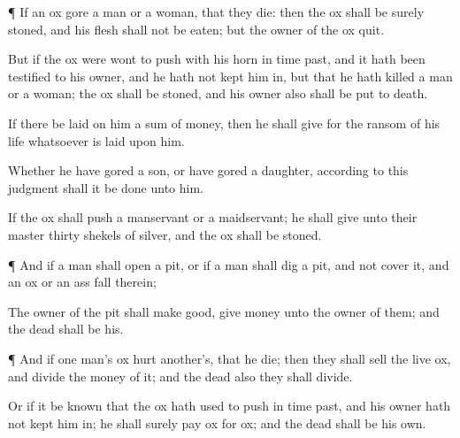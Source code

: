 {\par }{\PP {}¶ If an
ox
gore a
man or a
woman, that they
die: then the
ox shall be
surely
stoned, and his
flesh shall not be
eaten; but the
owner of the
ox
{}
quit.

But if the
ox were wont to push with his
horn in time
past, and it hath been
testified to his
owner, and he hath not
kept him in, but that he hath
killed a
man or a
woman; the
ox shall be
stoned, and his
owner also shall be put to
death.

If there be
laid on him a sum of
money, then he shall
give for the
ransom of his
life whatsoever is
laid upon him.

Whether he have
gored a
son,
or have
gored a
daughter, according to this
judgment shall it be
done unto him.

If the
ox shall
push a
manservant or a
maidservant; he shall
give unto their
master
thirty
shekels of
silver, and the
ox shall be
stoned.


\par }{\PP {}¶ And if a
man shall
open a
pit, or if a
man shall
dig a
pit, and not
cover it, and an
ox or an
ass
fall therein;

The
owner of the
pit shall make
{}
good,
{}
give
money unto the
owner of them; and the
dead
{} shall be his.


\par }{\PP {}¶ And if one
man’s
ox
hurt
another’s, that he
die; then they shall
sell the
live
ox, and
divide the
money of it; and the
dead
{} also they shall
divide.

Or if it be
known that the
ox hath used to
push in time
past, and his
owner hath not
kept him in; he shall
surely
pay
ox for
ox; and the
dead shall be his own.




\par }
